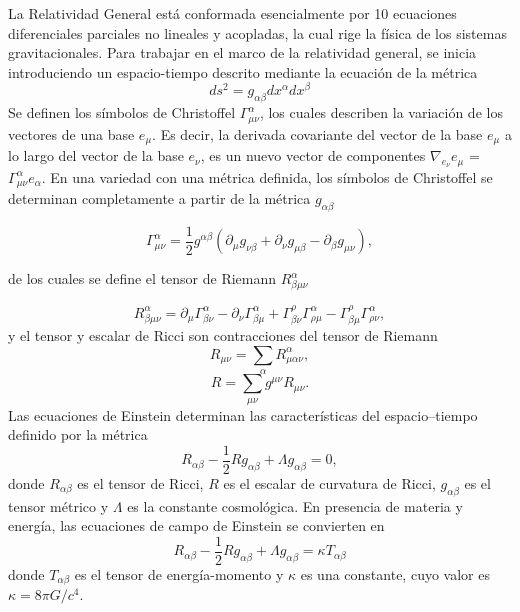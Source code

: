 \documentclass[a4paper,openright,12pt]{book}
\begin{document}
La Relatividad General está conformada esencialmente por 10 ecuaciones diferenciales parciales no lineales y acopladas, la cual rige la física de los sistemas gravitacionales. Para trabajar en el marco de la relatividad general, se inicia introduciendo un espacio-tiempo descrito mediante la ecuación de la métrica
\begin{equation}
ds^{2}=g_{\alpha \beta}dx^{\alpha}dx^{\beta}\label{eqn 1.11}
\end{equation}
Se definen los símbolos de Christoffel $\Gamma^{\alpha}_{\mu \nu}$, los cuales describen la variación de los vectores de una base $e_{\mu}$. Es decir, la derivada covariante del vector de la base $e_{\mu}$ a lo largo del vector de la base $e_{\nu}$, es un nuevo vector de componentes $\nabla_{e_{\nu}}e_{\mu}$ = $\Gamma^{\alpha}_{\mu \nu} e_{\alpha}$. En una variedad con una métrica definida, los símbolos de Christoffel se determinan completamente a partir de la métrica $g_{\alpha \beta}$ \cite{1.4}

\begin{equation*}
\Gamma^{\alpha}_{\mu \nu} = 
\frac{1}{2}g^{\alpha \beta}\left(\partial_{\mu}g_{\nu \beta} +
\partial_{\nu}g_{\mu \beta} - \partial_{\beta}g_{\mu \nu}\right), 
\end{equation*}

de los cuales se define el tensor de Riemann $R^{\alpha}_{\beta \mu \nu}$

\begin{equation*}
R^{\alpha}_{\beta \mu \nu}
=
\partial_{\mu}\Gamma^{\alpha}_{\beta \nu}
-
\partial_{\nu}\Gamma^{\alpha}_{\beta \mu}
+
\Gamma^{\rho}_{\beta \nu}\Gamma^{\alpha}_{\rho \mu}
-
\Gamma^{\rho}_{\beta \mu}\Gamma^{\alpha}_{\rho \nu},
\end{equation*}
y el tensor y escalar de Ricci son contracciones del tensor de Riemann
\begin{equation*}
R_{\mu \nu} = \sum_{\alpha}R^{\alpha}_{\mu \alpha \nu},
\end{equation*}
\begin{equation*}
R = \sum_{\mu \nu}g^{\mu \nu}R_{\mu \nu}.
\end{equation*}
Las ecuaciones de Einstein determinan las características del espacio--tiempo definido por la métrica
\begin{equation}
R_{\alpha \beta} - \frac{1}{2} R g_{\alpha \beta} + \Lambda g_{\alpha \beta} = 0,\label{eqn 1.12}
\end{equation}
donde $R_{\alpha \beta}$ es el tensor de Ricci, $R$ es el escalar de curvatura de Ricci, $g_{\alpha \beta}$ es el tensor métrico y $\Lambda$ es la constante cosmológica. En presencia de materia y energía, las ecuaciones de campo de Einstein se convierten en 
\begin{equation}
R_{\alpha \beta} - \frac{1}{2} R g_{\alpha \beta} + \Lambda g_{\alpha \beta} = \kappa T_{\alpha \beta}\label{eqn 1.13}
\end{equation}
donde $T_{\alpha \beta}$ es el tensor de energía-momento y $\kappa$ es una constante, cuyo valor es $\kappa = 8 \pi G / c^{4}$.
\end{document}
